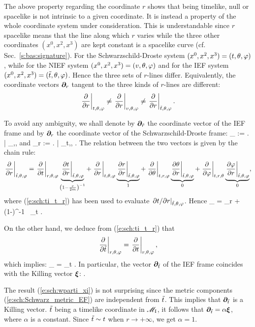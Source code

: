 \begin{remark} \label{r:sch:r_causal_type}
The above property regarding the coordinate $r$ shows that being timelike, null or spacelike
is not intrinsic to a given coordinate. It is instead a property
of the whole coordinate system under consideration. This is understandable
since $r$ spacelike means that the line along which $r$ varies while the
three other coordinates $(x^0,x^2,x^3)$ are kept constant is a spacelike curve
(cf. Sec.~\ref{s:bas:signature}).
For the Schwarzschild-Droste system $(x^0,x^2,x^3) = (t,\theta,\varphi)$,
while for the NIEF system
$(x^0,x^2,x^3) = (v,\theta,\varphi)$ and for
the IEF system $(x^0,x^2,x^3) = ({\tilde t},\theta,\varphi)$.
Hence the three sets of $r$-lines differ.
Equivalently, the coordinate vectors $\bm{\partial}_r$
tangent to the three kinds of $r$-lines are different:
\[
    \left. \frac{\partial }{\partial r} \right| _{t,\theta,\varphi} \not=
    \left. \frac{\partial }{\partial r} \right| _{v,\theta,\varphi} \not=
    \left. \frac{\partial }{\partial r} \right| _{{\tilde t},\theta,\varphi} .
\]
\end{remark}
To avoid any ambiguity, we shall denote by $\bm{\partial}_{\tilde{r}}$ the
coordinate vector of the IEF frame and by
$\bm{\partial}_r$ the coordinate vector of the Schwarzschild-Droste frame:
\be
    \wpar_{} := \left.  \right| _{\ti,\th,\ph}
    \qquad\mbox{and}\qquad
    \wpar_r := \left.  \right| _{t,\th,\ph} .
\ee
The relation between the two vectors is given by the chain rule:
\[
    \left. \frac{\partial }{\partial r} \right| _{{\tilde t},\theta,\varphi}  =
    \left. \frac{\partial }{\partial t} \right| _{r,\theta,\varphi}
    \underbrace{ \left. \frac{\partial t}{\partial r} \right| _{{\tilde t},\theta,\varphi}}_{\left(1-\frac{r}{2m}\right)^{-1}}
  + \left. \frac{\partial }{\partial r} \right| _{t,\theta,\varphi}
   \underbrace{\left. \frac{\partial r}{\partial r} \right| _{{\tilde t},\theta,\varphi}}_{1}
  + \left. \frac{\partial }{\partial \theta} \right| _{t,r,\varphi}
  \underbrace{\left. \frac{\partial \theta}{\partial r} \right| _{{\tilde t},\theta,\varphi}}_{0}
  + \left. \frac{\partial }{\partial \varphi} \right| _{t,r,\theta}
  \underbrace{\left. \frac{\partial \varphi}{\partial r} \right| _{{\tilde t},\theta,\varphi}}_{0} ,
\]
where (\ref{e:sch:ti_t_r}) has been used to evaluate
$\left. {\partial t}/{\partial r} \right| _{{\tilde t},\theta,\varphi}$. Hence
\be \label{e:sch:wpar_tilde_r}
    \wpar_{} = \wpar_r + \left(1-\right)^{-1} \, \wpar_t .
\ee

On the other hand, we deduce from (\ref{e:sch:ti_t_r}) that
\[
     \left. \frac{\partial }{\partial {\tilde t}} \right| _{r,\theta,\varphi} = \left. \frac{\partial }{\partial t} \right| _{r,\theta,\varphi} ,
\]
which implies:
\be  \label{e:sch:wpar_tilde_t}
    \wpar_{\ti} = \wpar_t .
\ee
In particular, the vector $\bm{\partial}_{{\tilde t}}$ of the IEF frame coincides with
the Killing vector $\bm{\xi}$:
\be \label{e:sch:wparti_xi}
    \encadre{ \wpar_{\ti} = \w{\xi}} .
\ee
\begin{remark}
The result (\ref{e:sch:wparti_xi}) is not surprising since
the metric components (\ref{e:sch:Schwarz_metric_EF}) are independent from
${\tilde t}$. This implies that $\bm{\partial}_{{\tilde t}}$ is a Killing vector. ${\tilde t}$ being a timelike coordinate in $\mathscr{M}_{\rm I}$, it
follows that $\bm{\partial}_{{\tilde t}} = \alpha \bm{\xi}$, where $\alpha$ is a constant.
Since ${\tilde t} \sim t$ when $r\rightarrow +\infty$, we get $\alpha=1$.
\end{remark}

